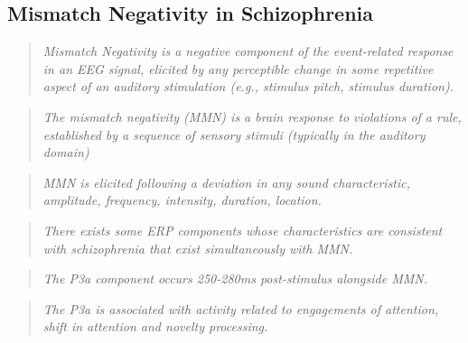 \subsection{Mismatch Negativity in Schizophrenia}
\begin{quotation}
	\textit{Mismatch Negativity is a negative component of the event-related response in an EEG signal, elicited by any perceptible change in some repetitive aspect of an auditory stimulation (e.g., stimulus pitch, stimulus duration).}
	\begin{flushright}
		\cite{goodwin2007heartland}
	\end{flushright}
\end{quotation}
\begin{quotation}
	\textit{The mismatch negativity (MMN) is a brain response to violations of a rule, established by a sequence of sensory stimuli (typically in the auditory domain)}
	\begin{flushright}
		\cite{etiologySZ}
	\end{flushright}
\end{quotation}
\begin{quotation}
	\textit{MMN is elicited following a deviation in any sound characteristic, amplitude, frequency, intensity, duration, location.}
	\begin{flushright}
		\cite{etiologySZ}
	\end{flushright}
\end{quotation}
\begin{quotation}
	\textit{There exists some ERP components whose characteristics are consistent with schizophrenia that exist simultaneously with MMN.}
	\begin{flushright}
		\cite{de2020pearls}
	\end{flushright}
\end{quotation}
\begin{quotation}
	\textit{The P3a component occurs 250-280ms post-stimulus alongside MMN.}
	\begin{flushright}
		\cite{comerchero1999p3a}
	\end{flushright}
\end{quotation}
\begin{quotation}
	\textit{The P3a is associated with activity related to engagements of attention, shift in attention and novelty processing.}
	\begin{flushright}
		\cite{friedman2001novelty}\cite{polich2007updating}
	\end{flushright}
\end{quotation}
